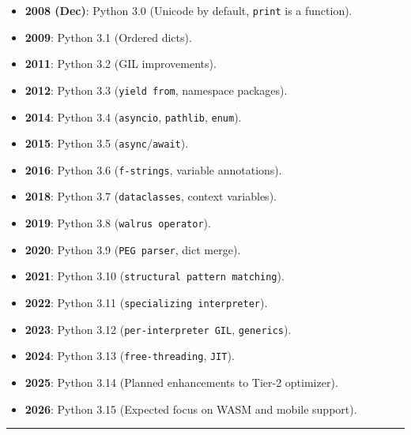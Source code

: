 \begin{itemize}
\tightlist
\item
  \textbf{2008 (Dec)}: Python 3.0 (Unicode by default,
  \passthrough{\lstinline!print!} is a function).
\item
  \textbf{2009}: Python 3.1 (Ordered dicts).
\item
  \textbf{2011}: Python 3.2 (GIL improvements).
\item
  \textbf{2012}: Python 3.3 (\passthrough{\lstinline!yield from!},
  namespace packages).
\item
  \textbf{2014}: Python 3.4 (\passthrough{\lstinline!asyncio!},
  \passthrough{\lstinline!pathlib!}, \passthrough{\lstinline!enum!}).
\item
  \textbf{2015}: Python 3.5
  (\passthrough{\lstinline!async!}/\passthrough{\lstinline!await!}).
\item
  \textbf{2016}: Python 3.6 (\passthrough{\lstinline!f-strings!},
  variable annotations).
\item
  \textbf{2018}: Python 3.7 (\passthrough{\lstinline!dataclasses!},
  context variables).
\item
  \textbf{2019}: Python 3.8 (\passthrough{\lstinline!walrus operator!}).
\item
  \textbf{2020}: Python 3.9 (\passthrough{\lstinline!PEG parser!}, dict
  merge).
\item
  \textbf{2021}: Python 3.10
  (\passthrough{\lstinline!structural pattern matching!}).
\item
  \textbf{2022}: Python 3.11
  (\passthrough{\lstinline!specializing interpreter!}).
\item
  \textbf{2023}: Python 3.12
  (\passthrough{\lstinline!per-interpreter GIL!},
  \passthrough{\lstinline!generics!}).
\item
  \textbf{2024}: Python 3.13 (\passthrough{\lstinline!free-threading!},
  \passthrough{\lstinline!JIT!}).
\item
  \textbf{2025}: Python 3.14 (Planned enhancements to Tier-2 optimizer).
\item
  \textbf{2026}: Python 3.15 (Expected focus on WASM and mobile
  support).
\end{itemize}

\begin{center}\rule{0.5\linewidth}{0.5pt}\end{center}

